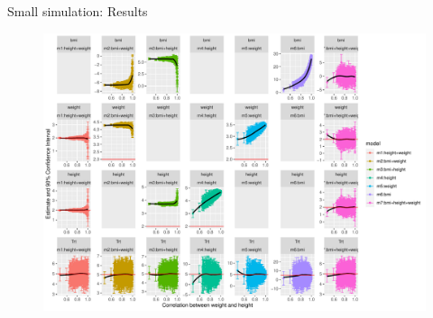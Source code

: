 \documentclass[english]{beamer}\usepackage[]{graphicx}\usepackage[]{xcolor}
\makeatletter
\def\maxwidth{ %
  \ifdim\Gin@nat@width>\linewidth
    \linewidth
  \else
    \Gin@nat@width
  \fi
}
\newenvironment{knitrout}{}{} %
\makeatother
\begin{document}
\begin{frame}[plain]{Small simulation: Results}

\begin{figure}[h]%
\begin{center}
\begin{knitrout}
\color{fgcolor}
\includegraphics[width=\maxwidth]{figures/figresults-1} 
\end{knitrout}
\end{center}
\end{figure}

\end{frame}
\end{document}
